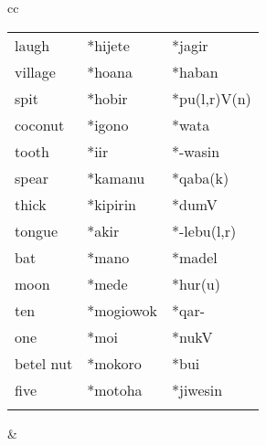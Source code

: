 \begin{table}[p]
\begin{tabular}{cc}
\begin{tabular}{lll}
laugh	&  *hijete	&  *jagir\\
village	&  *hoana{\ddag}	&  *haban {\ddag}\\
spit	&  *hobir	&  *pu(l,r)V(n)\\
coconut	&  *igono{\ddag}	&  *wata\\
tooth	&  *i{\ng}ir	&  *-wasin\\
{\lightgreycell}spear	& {\lightgreycell} *kamanu	& {\lightgreycell} *qaba(k){\ddag}\\
thick	&  *kipirin	&  *dumV{\ddag}\\
tongue	&  *akir	&  *-lebu(l,r)\\
bat	&  *mano {\ddag}	&  *madel\\
moon	&  *mede	&  *hur(u)\\
ten	&  *mogiowok	&  *qar- {\ddag}\\
one	&  *moi	&  *nukV\\
betel nut	&  *mokoro{\ddag}	&  *bui {\ddag}\\
five	&  *motoha	&  *jiwesin {\ddag}\\
 \\
\end{tabular}

&


\end{tabular}
\end{table}
